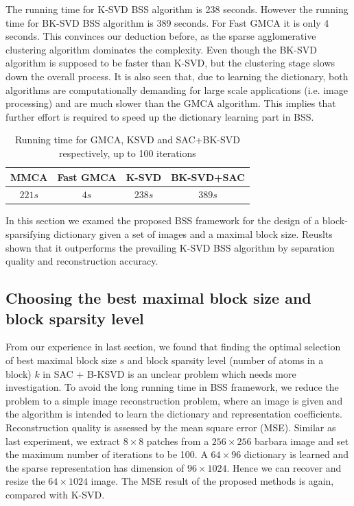 The running time for K-SVD BSS algorithm is 238 seconds. However the running time for BK-SVD BSS algorithm is 389 seconds. For Fast GMCA it is only 4 seconds. This convinces our deduction before, as the sparse agglomerative clustering algorithm dominates the complexity. Even though the BK-SVD algorithm is supposed to be faster than K-SVD, but the clustering stage slows down the overall process. It is also seen that, due to learning the dictionary, both algorithms are computationally demanding for large scale applications (i.e. image processing) and are much slower than the GMCA algorithm. This implies that further effort is required to speed up the dictionary learning part in BSS. \\
\begin{table}[!htbp]
\centering
    \begin{tabular}{|c|c|c|c|}
    \hline
    MMCA & Fast GMCA & K-SVD & BK-SVD+SAC \\\hline
    $221s$ & $4s$ & $238s$ & $389s$ \\\hline
    \end{tabular}
    \caption{Running time for GMCA, KSVD and SAC+BK-SVD respectively, up to 100 iterations}
\end{table}

In this section we examed the proposed BSS framework for the design of a block-sparsifying dictionary given a set of images and a maximal block size. Reuslts shown that it outperforms the prevailing K-SVD BSS algorithm by separation quality and reconstruction accuracy.

\subsection{Choosing the best maximal block size and block sparsity level}
From our experience in last section, we found that finding the optimal selection of best maximal block size $s$ and block sparsity level (number of atoms in a block) $k$ in SAC + B-KSVD is an unclear problem which needs more investigation. To avoid the long running time in BSS framework, we reduce the problem to a simple image reconstruction problem, where an image is given and the algorithm is intended to learn the dictionary and representation coefficients. Reconstruction quality is assessed by the mean square error (MSE). Similar as last experiment, we extract $8 \times 8$ patches from a $256 \times 256$ barbara image and set the maximum number of iterations to be 100. A $64 \times 96$ dictionary is learned and the sparse representation has dimension of $96\times1024$. Hence we can recover and resize the $64\times1024$ image. The MSE result of the proposed methods is again, compared with K-SVD.\\

